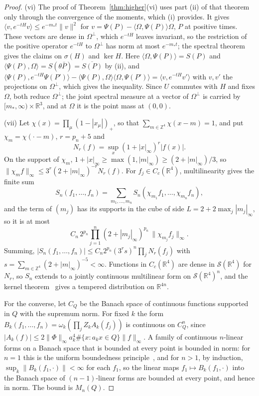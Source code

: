 \documentclass[aps,prd,twocolumn,superscriptaddress,nofootinbib,longbibliography,floatfix,amsmath,amssymb,10pt]{revtex4-2}
\theoremstyle{definition}
\theoremstyle{remark}
\newcommand{\R}{\mathbb{R}}
\newcommand{\Z}{\mathbb{Z}}
\newcommand{\ip}[2]{\langle #1,#2\rangle}
\begin{document}
\begin{proof}
(vi) The proof of Theorem~\ref{thm:higher}(vi) uses part (ii) of that
theorem only through the convergence of the moments, which (i) provides. It
gives $\ip v{e^{-tH}v}\le e^{-m_*t}\|v\|^2$ for $v=\Psi(P)-\ip\Omega
{\Psi(P)}\Omega$, $P$ at positive times. These vectors are dense in
$\Omega^\perp$, which $e^{-tH}$ leaves invariant, so the restriction of the
positive operator $e^{-tH}$ to $\Omega^\perp$ has norm at most
$e^{-m_*t}$; the spectral theorem gives the claims on $\sigma(H)$ and
$\ker H$. Here $\ip\Omega{\Psi(P)}=S(P)$ and $\ip{\Psi(P)}\Omega=
S(\theta\bar P)=\overline{S(P)}$ by (ii), and $\ip{\Psi(P)}{e^{-tH}
\Psi(P')}-\ip{\Psi(P)}\Omega\ip\Omega{\Psi(P')}=\ip v{e^{-tH}v'}$ with $v,v'$
the projections on $\Omega^\perp$, which gives the inequality. Since $U$
commutes with $H$ and fixes $\Omega$, both reduce $\Omega^\perp$; the joint
spectral measure at a vector of $\Omega^\perp$ is carried by
$[m_*,\infty)\times\R^3$, and at $\Omega$ it is the point mass at $(0,0)$.

(vii) Let $\chi(x)=\prod_\mu(1-|x_\mu|)_+$, so that $\sum_{m\in\Z^4}
\chi(x-m)=1$, and put $\chi_m=\chi(\cdot-m)$, $r=p_n+5$ and
\[
N_r(f)=\sup_x(1+|x|_\infty)^r|f(x)| .
\]
On the support of $\chi_m$, $1+|x|_\infty\ge
\max(1,|m|_\infty)\ge(2+|m|_\infty)/3$, so $\|\chi_mf\|_\infty\le3^r
(2+|m|_\infty)^{-r}N_r(f)$. For $f_j\in C_c(\R^4)$, multilinearity gives
the finite sum
\[
S_n(f_1,\dots,f_n)=\sum_{m_1,\dots,m_n}S_n(\chi_{m_1}f_1,\dots,
\chi_{m_n}f_n),
\]
and the term of $(m_j)$ has its supports in
the cube of side $L=2+2\max_j|m_j|_\infty$, so it is at most
\[
C_n\,2^{p_n}\prod_{j=1}^n(2+|m_j|_\infty)^{p_n}\,\|\chi_{m_j}f_j\|_\infty .
\]
Summing, $|S_n(f_1,\dots,f_n)|\le C_n2^{p_n}(3^rs)^n\prod_jN_r(f_j)$ with
$s=\sum_{m\in\Z^4}(2+|m|_\infty)^{-5}<\infty$. Functions in $C_c(\R^4)$ are
dense in $\mathcal S(\R^4)$ for $N_r$, so $S_n$ extends to a jointly
continuous multilinear form on $\mathcal S(\R^4)^n$, and the kernel
theorem~\cite[Sect.~V.3]{RS80} gives a tempered distribution on $\R^{4n}$.

For the converse, let $C_Q$ be the Banach space of continuous functions
supported in $Q$ with the supremum norm. For fixed $k$ the form
$B_k(f_1,\dots,f_n)=\omega_k(\prod_jZ_kA_k(f_j))$ is continuous on $C_Q^n$,
since $|A_k(f)|\le2\|\Phi\|_\infty a_k^4\#\{x:a_kx\in Q\}\|f\|_\infty$. A
family of continuous $n$-linear forms on a Banach space that is bounded at
every point is bounded in norm: for $n=1$ this is the uniform boundedness
principle~\cite{RS80}, and for $n>1$, by induction, $\sup_k\|B_k(f_1,\cdot)
\|<\infty$ for each $f_1$, so the linear maps $f_1\mapsto B_k(f_1,\cdot)$
into the Banach space of $(n-1)$-linear forms are bounded at every point,
and hence in norm. The bound is $M_n(Q)$.
\end{proof}
\end{document}
